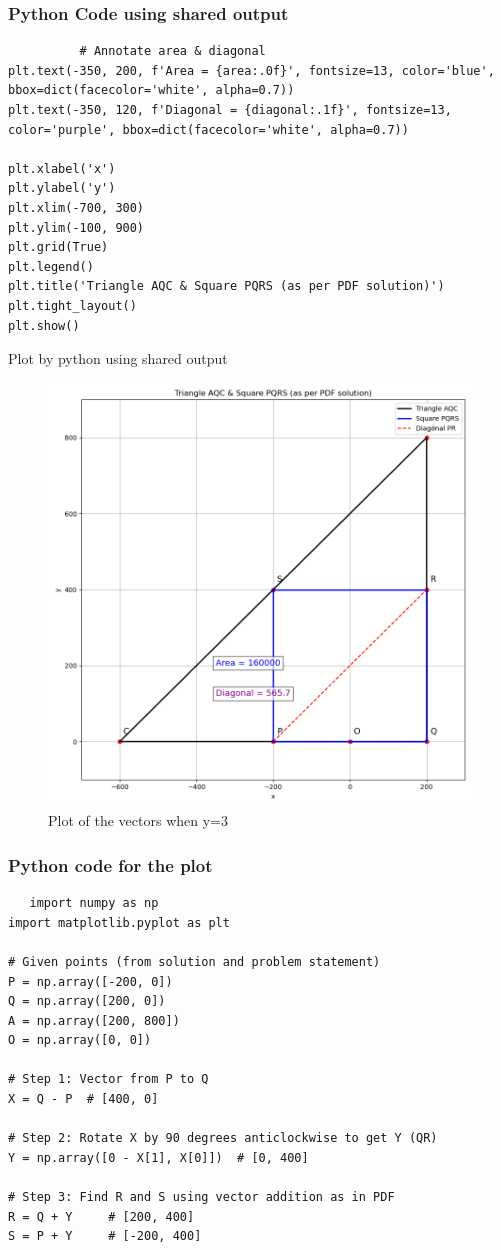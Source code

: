 \documentclass{beamer}
\begin{document}
\begin{frame}[fragile]
        \frametitle{Python Code using shared output}
      \begin{lstlisting}
          # Annotate area & diagonal
plt.text(-350, 200, f'Area = {area:.0f}', fontsize=13, color='blue', bbox=dict(facecolor='white', alpha=0.7))
plt.text(-350, 120, f'Diagonal = {diagonal:.1f}', fontsize=13, color='purple', bbox=dict(facecolor='white', alpha=0.7))

plt.xlabel('x')
plt.ylabel('y')
plt.xlim(-700, 300)
plt.ylim(-100, 900)
plt.grid(True)
plt.legend()
plt.title('Triangle AQC & Square PQRS (as per PDF solution)')
plt.tight_layout()
plt.show()
      \end{lstlisting}
\end{frame}
\begin{frame}{Plot by python using shared output}
	\begin{center}
	\begin{figure}[H]
		\centering
		\includegraphics[width = 0.7\columnwidth]{figs/fig1.png}
		\caption{Plot of the vectors when y=3}
		\label{fig1}
	\end{figure}
	\end{center}
\end{frame}
\begin{frame}[fragile]
     \frametitle{Python code for the plot}
\begin{lstlisting}
   import numpy as np
import matplotlib.pyplot as plt

# Given points (from solution and problem statement)
P = np.array([-200, 0])
Q = np.array([200, 0])
A = np.array([200, 800])
O = np.array([0, 0])

# Step 1: Vector from P to Q
X = Q - P  # [400, 0]

# Step 2: Rotate X by 90 degrees anticlockwise to get Y (QR)
Y = np.array([0 - X[1], X[0]])  # [0, 400]

# Step 3: Find R and S using vector addition as in PDF
R = Q + Y     # [200, 400]
S = P + Y     # [-200, 400]


\end{lstlisting}
\end{frame}
\end{document}
